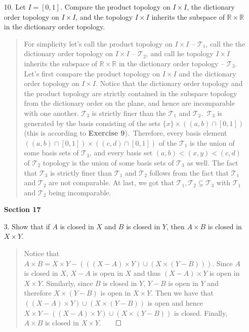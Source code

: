 \documentclass[12pt, a4paper]{article}
\newcommand{\reals}{\mathbb{R}} %
\newcommand{\topology}{\mathcal{T}} %
\newcommand\und[1]{\underline{\smash{#1}}}
\begin{document}
\begin{itemize}
\item[10.]
Let $I = [0, 1]$. Compare the product topology on $I \times I$, the dictionary order
topology on $I \times I$, and the topology $I \times I$ inherits the subspace of $\reals \times \reals$
in the dictionary order topology.
\begin{quote}
\und{\textbf{NOTE}}
For simplicity let's call the product topology on $I \times I$ -- $\topology_1$,
call the the dictionary order topology on $I \times I$ -- $\topology_2$, and
call he topology $I \times I$ inherits the subspace of $\reals \times \reals$
in the dictionary order topology -- $\topology_3$.
\newline
\newline
Let's first compare the product topology on $I \times I$ and the dictionary order topology on $I \times I$.
Notice that the dictionary order topology and the product topology are strictly contained in the subspace
topology from the dictionary order on the plane, and hence are incomparable with one another.
\newline
\newline
$\topology_3$ is strictly finer than the $\topology_1$ and $\topology_2$.\
$\topology_3$ is generated by the basis consisting of the sets $\{x\} \times ((a, b) \cap [0, 1])$ (this is according to \textbf{Exercise 9}).\
Therefore, every basis element $((a, b) \cap [0, 1]) \times ((c, d) \cap [0, 1])$ of the $\topology_1$ is the
union of some basis sets of $\topology_3$, and every basis set $(a, b) < (x, y) < (c, d)$ of $\topology_2$
topology is the union of some basis sets of $\topology_3$ as well. The fact that $\topology_3$ is
strictly finer than $\topology_1$ and $\topology_2$ follows from the fact that $\topology_1$ and $\topology_2$ are not comparable.
\newline
\newline
At last, we got that $\topology_1, \topology_2 \subsetneq \topology_3$ with $\topology_1$ and $\topology_2$ being incomparable.
\end{quote}

\item[]
\item[]
\item[]

{\large \textbf{Section 17}}
\vspace{0.3cm}
\item[3.]
Show that if $A$ is closed in $X$ and $B$ is closed in $Y$, then $A \times B$ is closed in $X \times Y$.
\begin{quote}
Notice that $A \times B = X \times Y - (((X - A) \times Y) \cup (X \times (Y - B)))$.
Since $A$ is closed in $X$, $X - A$ is open in $X$ and thus $(X - A) \times Y$ is open in $X \times Y$.
Similarly, since $B$ is closed in $Y$, $Y - B$ is open in $Y$ and therefore $X \times (Y - B)$ is open in $X \times Y$.
Then we have that $((X - A) \times Y) \cup (X \times (Y - B))$ is open and hence $X \times Y - ((X - A) \times Y) \cup (X \times (Y - B))$
is closed. Finally, $A \times B$ is closed in $X \times Y$.$\qed$
\end{quote}


\end{itemize}
\end{document}
